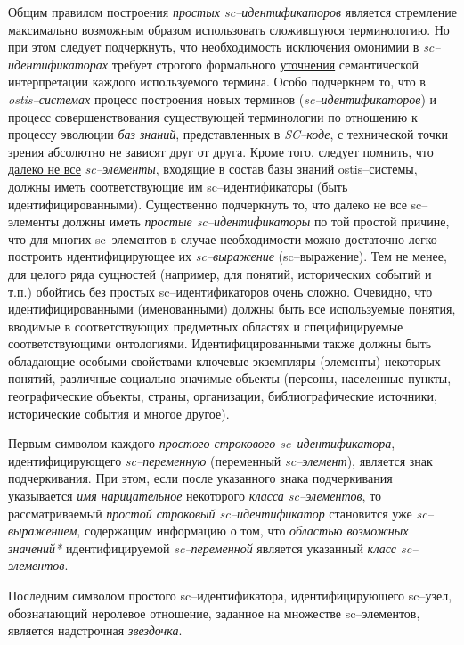Общим правилом построения \textit{простых sc--идентификаторов} является стремление максимально возможным образом использовать сложившуюся терминологию. Но при этом следует подчеркнуть, что необходимость исключения омонимии в \textit{sc--идентификаторах} требует строгого формального \uline{уточнения} семантической интерпретации каждого используемого термина. Особо подчеркнем то, что в \textit{ostis--системах} процесс построения новых терминов (\textit{sc--идентификаторов}) и процесс совершенствования существующей терминологии по отношению к процессу эволюции \textit{баз знаний}, представленных в \textit{SC--коде}, с технической точки зрения абсолютно не зависят друг от друга. Кроме того, следует помнить, что \uline{далеко не все} \textit{sc--элементы}, входящие в состав базы знаний ostis--системы, должны иметь соответствующие им sc--идентификаторы (быть идентифицированными). Существенно подчеркнуть то, что далеко не все sc--элементы должны иметь \textit{простые sc--идентификаторы} по той простой причине, что для многих sc--элементов в случае необходимости можно достаточно легко построить идентифицирующее их \textit{sc--выражение} (sc--выражение). Тем не менее, для целого ряда сущностей (например, для понятий, исторических событий и т.п.) обойтись без простых sc--идентификаторов очень сложно. Очевидно, что идентифицированными (именованными) должны быть все используемые понятия, вводимые в соответствующих предметных областях и специфицируемые соответствующими онтологиями. Идентифицированными также должны быть обладающие особыми свойствами ключевые экземпляры (элементы) некоторых понятий, различные социально значимые объекты (персоны, населенные пункты, географические объекты, страны, организации, библиографические источники, исторические события и многое другое).

Первым символом каждого \textit{простого строкового sc--идентификатора}, идентифицирующего \textit{sc--переменную} (переменный \textit{sc--элемент}), является знак подчеркивания. При этом, если после указанного знака подчеркивания указывается \textit{имя нарицательное} некоторого \textit{класса sc--элементов}, то рассматриваемый \textit{простой строковый sc--идентификатор} становится уже \textit{sc--выражением}, содержащим информацию о том, что \textit{областью возможных значений*} идентифицируемой \textit{sc--переменной} является указанный \textit{класс sc--элементов}.

Последним символом простого sc--идентификатора, идентифицирующего sc--узел, обозначающий неролевое отношение, заданное на множестве sc--элементов, является надстрочная \textit{звездочка}.


